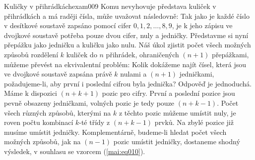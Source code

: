 \begin{mathexam}{Kuličky v přihrádkách}{exam009}
  Komu nevyhovuje představa kuliček v přihrádkách a má raději čísla, může uvažovat následovně: Tak
  jako je každé číslo v desítkové soustavě zapsáno pomocí cifer \(0, 1, 2, \ldots , 8, 9\), je k
  jeho zápisu ve dvojkové soustavě potřeba pouze dvou cifer, nuly a jedničky. Představme si nyní
  přepážku jako jedničku a kuličku jako nulu. Náš úkol zjistit počet všech možných způsobů rozdělení
  \(k\) kuliček do \(n\) přihrádek, ohraničených \((n+1)\) přepážkami, můžeme převést na
  ekvivalentní problém: Kolik dokážeme najít čísel, která jsou ve dvojkové soustavě zapsána právě
  \(k\) nulami a \((n + 1)\) jedničkami, požadujeme-li, aby první i poslední cifrou byla jednička?
  Odpověď je jednoduchá. Máme k dispozici \((n+k+1)\) pozic pro cifry. První a poslední pozice jsou
  pevně obsazeny jedničkami, volných pozic je tedy pouze \((n + k - 1)\). Počet všech různých
  způsobů, kterými na \(k\) z těchto pozic můžeme umístit nuly, je roven počtu kombinací \(k\)-té
  třídy z \((n + k - 1)\) prvků. Na zbylé pozice již musíme umístit jedničky. Komplementárně,
  budeme-li hledat počet všech možných způsobů, jak na \((n-1)\) pozic umístit jedničky, dostaneme
  shodný výsledek, v souhlasu se vzorcem (\ref{mai:eq010}).
\end{mathexam}